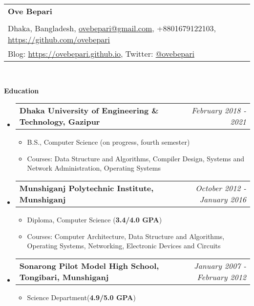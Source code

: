 \documentclass[letterpaper,10pt]{article}
\makeatletter
\newcommand{\resheading}[1]{{\large \colorbox{mygrey}{\begin{minipage}{\textwidth}{\textbf{#1 \vphantom{p\^{E}}}}\end{minipage}}}}
\newcommand{\ressubheading}[4]{
	\begin{tabular*}{7.0in}{l@{\extracolsep{\fill}}r}
		\textbf{#1} & \textit{#4} \\
	\end{tabular*}\vspace{-6pt}}
\makeatother
\begin{document}
	
	\begin{tabular*}{7.5in}{l@{\extracolsep{\fill}}}
		\textbf{\large Ove Bepari}\\
		\\
		
		Dhaka, Bangladesh, \href{mailto:ovebepari@gmail.com}{ovebepari@gmail.com}, +8801679122103, \url{https://github.com/ovebepari} \\
		 Blog: \url{https://ovebepari.github.io}, Twitter: \href{https://twitter.com/ovebepari}{@ovebepari}
	
		\\

	\end{tabular*}
	\\
	
	\vspace{0.3in}
	
	\resheading{Education}
	\begin{itemize}
		
				
		\item \ressubheading{Dhaka University of Engineering \& Technology, Gazipur}{}{}{February 2018 - 2021}
		\begin{itemize}
			\item B.S., Computer Science (on progress, fourth semester)
			\item Courses: Data Structure and Algorithms, Compiler Design, Systems and Network Administration, Operating Systems
		\end{itemize}
	
				
		\item \ressubheading{Munshiganj Polytechnic Institute, Munshiganj}{}{}{October 2012 - January 2016}
		\begin{itemize}
			\item Diploma, Computer Science (\textbf{3.4/4.0 GPA})
			\item Courses: Computer Architecture, Data Structure and Algorithms, Operating Systems, Networking, Electronic Devices and Circuits
		\end{itemize}
		
		
		\item \ressubheading{Sonarong Pilot Model High School, Tongibari, Munshiganj}{}{}{January 2007 - February 2012}
		\begin{itemize}
			\item Science Department(\textbf{4.9/5.0 GPA})
		\end{itemize}

	
	\end{itemize}
	
\end{document}
